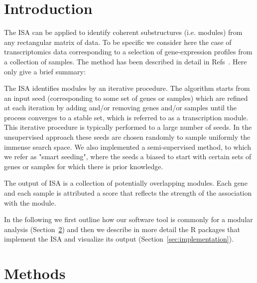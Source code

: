 \documentclass{bioinfo}
\begin{document}
\section{Introduction}

The ISA can be applied to identify coherent substructures (i.e. modules)
from any rectangular matrix of data. To be specific we consider here the
case of transcriptomics data corresponding to a selection of gene-expression
profiles from a collection of samples. The method has been described in
detail in Refs~\cite{BioISA,PREISA}. Here only give a brief summary:

The ISA identifies modules by an iterative procedure. The algorithm starts
from an input seed (corresponding to some set of genes or samples) which are
refined at each iteration by adding and/or removing genes and/or samples
until the process converges to a stable set, which is referred to as a
transcription module. This iterative procedure is typically performed to a
large number of seeds. In the unsupervised approach these seeds are chosen
randomly to sample uniformly the immense search space. We also implemented a
semi-supervised method, to which we refer as "smart seeding", where the
seeds a biased to start with certain sets of genes or samples for which
there is prior knowledge.

The output of ISA is a collection of potentially overlapping modules. Each
gene and each sample is attributed a score that reflects the strength of the
association with the module.

In the following we first outline how our software tool is commonly for a
modular analysis (Section~\ref{sec:methods}) and then we describe in more
detail the R packages that implement the ISA and visualize its output
(Section~\ref{sec:implementation}).

\section{Methods}%
\label{sec:methods}
\end{document}
